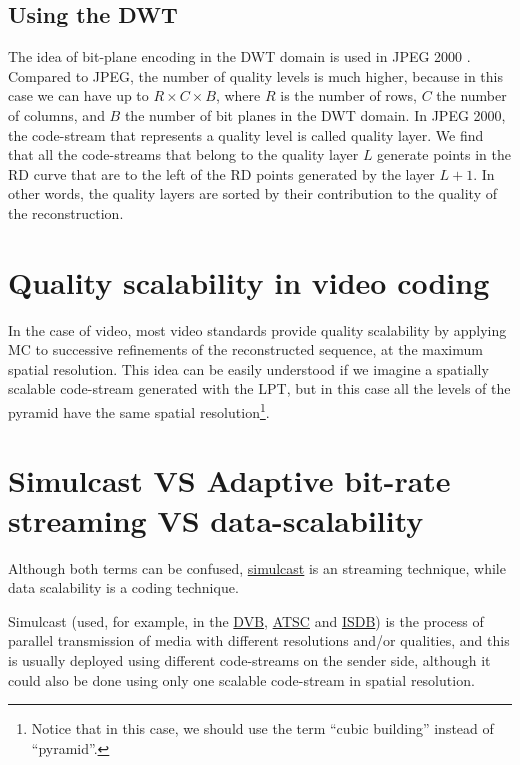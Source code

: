 \subsection{Using the DWT~\cite{vruiz__transform_coding}}

The idea of bit-plane encoding in the DWT domain is used in
JPEG 2000 \cite{vruiz__JPEG2000}. Compared to JPEG, the number of
quality levels is much higher, because in this case we can have up to
$R\times C\times B$, where $R$ is the number of rows, $C$ the number
of columns, and $B$ the number of bit planes in the DWT domain. In
JPEG 2000, the code-stream that represents a quality level is called
quality layer. We find that all the code-streams that belong to the
quality layer $L$ generate points in the RD curve that are to the
left of the RD points generated by the layer $L+1$. In other
words, the quality layers are sorted by their contribution to the
quality of the reconstruction.

\section{Quality scalability in video coding~\cite{vruiz__video_scalability}}

In the case of video, most video standards provide quality scalability
by applying MC to successive refinements of the reconstructed
sequence, at the maximum spatial resolution. This idea can be easily
understood if we imagine a spatially scalable code-stream generated
with the LPT, but in this case all the levels of the pyramid have the
same spatial resolution\footnote{Notice that in this case, we should
  use the term ``cubic building'' instead of ``pyramid''.}.


\section{Simulcast VS Adaptive bit-rate streaming VS data-scalability}


Although both terms can be confused,
\href{https://en.wikipedia.org/wiki/Simulcast}{simulcast} is an
streaming technique, while data scalability is a coding technique.

Simulcast (used, for example, in the
\href{https://en.wikipedia.org/wiki/DVB}{DVB},
\href{https://en.wikipedia.org/wiki/ATSC_standards}{ATSC} and
\href{https://en.wikipedia.org/wiki/ISDB}{ISDB}) is the process of
parallel transmission of media with different resolutions and/or
qualities, and this is usually deployed using different code-streams
on the sender side, although it could also be done using only one
scalable code-stream in spatial resolution.


